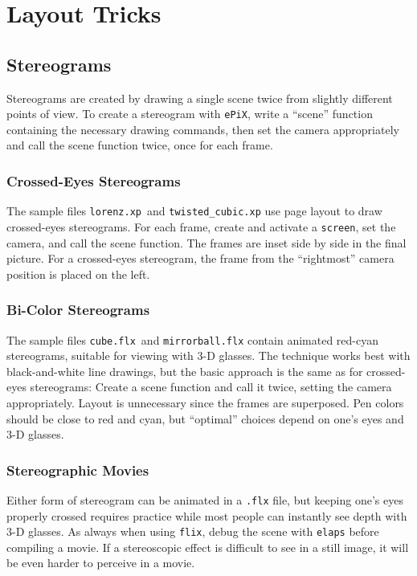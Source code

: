\documentclass[12pt,letterpaper]{book}
\newcommand{\code}[1]{\texttt{#1}}
\newcommand{\filename}[1]{\texttt{#1}}
\newcommand{\ePiX}{\code{ePiX}}
\begin{document}
\section{Layout Tricks}
\label{section-layout}

\subsection{Stereograms}
Stereograms are created by drawing a single scene twice from slightly
different points of view. To create a stereogram with \ePiX, write a
``scene'' function containing the necessary drawing commands, then set
the camera appropriately and call the scene function twice, once for
each frame. 

\subsubsection*{Crossed-Eyes Stereograms}

The sample files \filename{lorenz.xp}~and \filename{twisted\_cubic.xp}
use page layout to draw crossed-eyes stereograms. For each frame,
create and activate a \code{screen}, set the camera, and call the
scene function. The frames are inset side by side in the final
picture. For a crossed-eyes stereogram, the frame from the
``rightmost'' camera position is placed on the left.

\subsubsection*{Bi-Color Stereograms}

The sample files \filename{cube.flx}~and \filename{mirrorball.flx}
contain animated red-cyan stereograms, suitable for viewing with 3-D
glasses. The technique works best with black-and-white line drawings,
but the basic approach is the same as for crossed-eyes stereograms:
Create a scene function and call it twice, setting the camera
appropriately. Layout is unnecessary since the frames are superposed.
Pen colors should be close to red and cyan, but ``optimal'' choices
depend on one's eyes and 3-D glasses.

\subsubsection*{Stereographic Movies}

Either form of stereogram can be animated in a \code{.flx} file, but
keeping one's eyes properly crossed requires practice while most
people can instantly see depth with 3-D glasses. As always when using
\code{flix}, debug the scene with \code{elaps} before compiling a
movie. If a stereoscopic effect is difficult to see in a still image,
it will be even harder to perceive in a movie.
\end{document}
